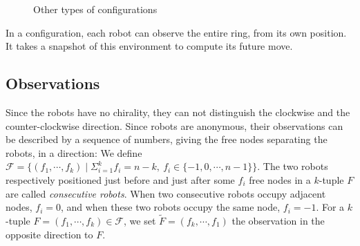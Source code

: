 \begin{example}
\begin{figure}[h]
{
	}\hspace{0.3em}
	\caption{Other types of configurations}
	\label{fig:otherConf}
\end{figure}

\end{example}

In a configuration, each robot can observe the entire ring, from
its own position. It takes a snapshot of this environment to compute its
future move. 

\subsection{Observations}
\label{subsubsec:obs}
Since the robots have no chirality, they can
not distinguish the clockwise and the counter-clockwise direction. Since robots are anonymous, 
their observations can be described by a sequence of numbers, giving the free
nodes separating the robots, in a direction: We define $\mathcal{F}= \{(f_1,\cdots,f_k)
\mid \Sigma_{i=1}^k f_i=n-k, \ f_i\in \{-1,0,\cdots, n-1\} \}$. The two robots respectively positioned just 
before and just after some $f_i$ free nodes in a $k$-tuple $F$ are called \emph{consecutive robots}. 
When two consecutive robots occupy adjacent nodes,
$f_i=0$, and when these two robots occupy the same node, $f_i=-1$.
 For a $k$-tuple $F= (f_1,\cdots,f_k) \in \mathcal{F}$, we set
$\tilde{F} = (f_k, \cdots, f_1)$ the observation in the opposite
direction to $F$.  

